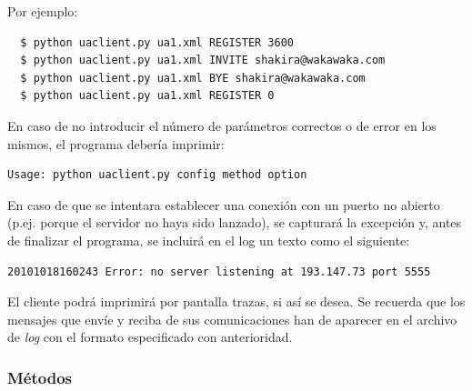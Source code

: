 \documentclass[a4paper,11pt]{article}
\begin{document}
Por ejemplo:
\begin{verbatim}
  $ python uaclient.py ua1.xml REGISTER 3600
  $ python uaclient.py ua1.xml INVITE shakira@wakawaka.com
  $ python uaclient.py ua1.xml BYE shakira@wakawaka.com
  $ python uaclient.py ua1.xml REGISTER 0
\end{verbatim}

En caso de no introducir el número de parámetros correctos o de error en los mismos, el programa debería imprimir:
\begin{verbatim}
Usage: python uaclient.py config method option
\end{verbatim}

En caso de que se intentara establecer una conexión con un puerto no abierto
(p.ej. porque el servidor no haya sido lanzado), se capturará la excepción y, antes de finalizar el programa, se incluirá en el log un texto como el siguiente:
\begin{verbatim}
20101018160243 Error: no server listening at 193.147.73 port 5555
\end{verbatim}

El cliente podrá imprimirá por pantalla trazas, si así se desea. Se recuerda que 
los mensajes que envíe y reciba de sus comunicaciones han de aparecer
en el archivo de \emph{log} con el formato especificado con anterioridad.

\subsubsection{Métodos}
\end{document}
